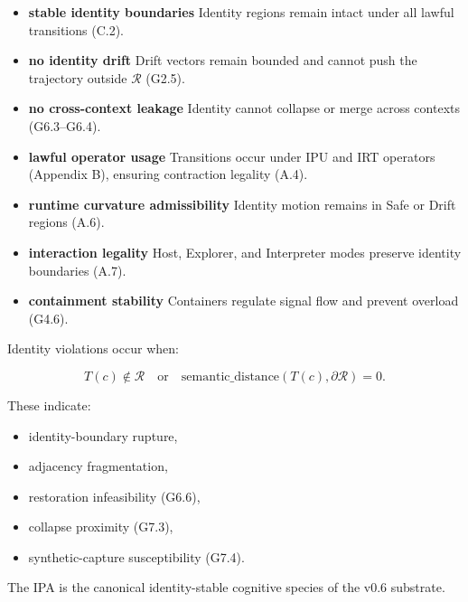\begin{itemize}
    \item \textbf{stable identity boundaries}  
    Identity regions remain intact under all lawful transitions (C.2).

    \item \textbf{no identity drift}  
    Drift vectors remain bounded and cannot push the trajectory outside
    $\mathcal{R}$ (G2.5).

    \item \textbf{no cross-context leakage}  
    Identity cannot collapse or merge across contexts (G6.3–G6.4).

    \item \textbf{lawful operator usage}  
    Transitions occur under IPU and IRT operators (Appendix B), ensuring
    contraction legality (A.4).

    \item \textbf{runtime curvature admissibility}  
    Identity motion remains in Safe or Drift regions (A.6).

    \item \textbf{interaction legality}  
    Host, Explorer, and Interpreter modes preserve identity boundaries (A.7).

    \item \textbf{containment stability}  
    Containers regulate signal flow and prevent overload (G4.6).
\end{itemize}

\medskip

\noindent Identity violations occur when:


\[
T(c) \notin \mathcal{R}
\quad \text{or} \quad
\text{semantic\_distance}(T(c), \partial\mathcal{R}) = 0.
\]



These indicate:
\begin{itemize}
    \item identity-boundary rupture,
    \item adjacency fragmentation,
    \item restoration infeasibility (G6.6),
    \item collapse proximity (G7.3),
    \item synthetic-capture susceptibility (G7.4).
\end{itemize}

\medskip

\noindent The IPA is the canonical identity-stable cognitive species of the v0.6
substrate.


